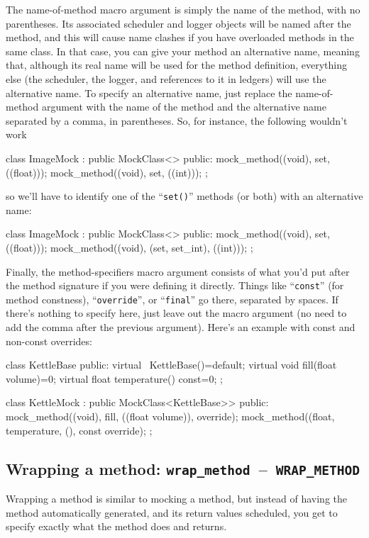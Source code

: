\documentclass[twoside, a4paper, article]{memoir}
\newcommand*\testudocolor{\color{red!80!blue}}
\newcommand*\testudo[1]{\texttt{\testudocolor{}#1}}
\newcommand*\testudopair[2]{\testudo{#1}~--~\testudo{#2}}
\newcommand\subsectiontestudopair[3]{%
  \subsection[#1]{#1: \testudopair{#2}{#3}}}
\begin{document}
The name-of-method macro argument is simply the name of the method, with no
parentheses.  Its associated scheduler and logger objects will be named after
the method, and this will cause name clashes if you have overloaded methods in
the same class.  In that case, you can give your method an alternative name,
meaning that, although its real name will be used for the method definition,
everything else (the scheduler, the logger, and references to it in ledgers)
will use the alternative name.  To specify an alternative name, just replace
the name-of-method argument with the name of the method and the alternative
name separated by a comma, in parentheses.  So, for instance, the following
wouldn't work
\begin{cpplisting}
class ImageMock
  : public MockClass<> {
public:
  mock_method((void), set, ((float)));
  mock_method((void), set, ((int)));
};
\end{cpplisting}
so we'll have to identify one of the ``\texttt{set()}'' methods (or both) with
an alternative name:
\begin{cpplisting}
class ImageMock
  : public MockClass<> {
public:
  mock_method((void), set, ((float)));
  mock_method((void), (set, set_int), ((int)));
};
\end{cpplisting}

Finally, the method-specifiers macro argument consists of what you'd put after
the method signature if you were defining it directly.  Things like
``\texttt{const}'' (for method constness), ``\texttt{override}'', or
``\texttt{final}'' go there, separated by spaces.  If there's nothing to
specify here, just leave out the macro argument (no need to add the comma after
the previous argument).  Here's an example with const and non-const overrides:
\begin{cpplisting}
class KettleBase {
public:
  virtual ~KettleBase()=default;
  virtual void fill(float volume)=0;
  virtual float temperature() const=0;
};

class KettleMock
  : public MockClass<KettleBase>> {
public:
  mock_method((void), fill, ((float volume)), override);
  mock_method((float, temperature, (), const override);
};
\end{cpplisting}


\subsectiontestudopair{Wrapping a method}{wrap\_method}{WRAP\_METHOD}
\label{sec:wrapping-method}

Wrapping a method is similar to mocking a method, but instead of having the
method automatically generated, and its return values scheduled, you get to
specify exactly what the method does and returns.
\end{document}
